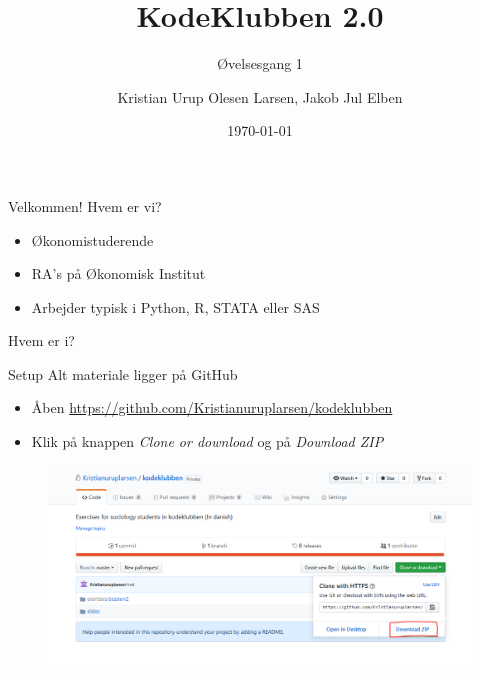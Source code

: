 \documentclass[10pt]{beamer}
\title{KodeKlubben 2.0}
\subtitle{Øvelsesgang 1}
\date{\today}
\author{Kristian Urup Olesen Larsen, Jakob Jul Elben}
\institute{Økonomisk Institut, KU}
\begin{document}
\maketitle

\begin{frame}[fragile]{Velkommen!}
Hvem er vi?
\begin{itemize}
  \item Økonomistuderende
  \item RA's på Økonomisk Institut
  \item Arbejder typisk i Python, R, STATA eller SAS
\end{itemize}
Hvem er i?
\end{frame}

\begin{frame}[fragile]{Setup}
  Alt materiale ligger på GitHub
\begin{itemize}
  \item Åben \href{https://github.com/Kristianuruplarsen/kodeklubben}{https://github.com/Kristianuruplarsen/kodeklubben}
  \item Klik på knappen \textit{Clone or download} og på \textit{Download ZIP}
\end{itemize}

\begin{figure}
  \center
  \includegraphics[width=\textwidth]{figs/setup.PNG}
\end{figure}
\end{frame}
\end{document}
